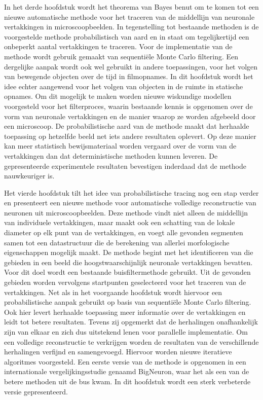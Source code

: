 In het derde hoofdstuk wordt het theorema van Bayes benut om te komen tot een nieuwe automatische methode voor het traceren van de middellijn van neuronale vertakkingen in microscoopbeelden. In tegenstelling tot bestaande methoden is de voorgestelde methode probabilistisch van aard en in staat om tegelijkertijd een onbeperkt aantal vertakkingen te traceren. Voor de implementatie van de methode wordt gebruik gemaakt van sequentiële Monte Carlo filtering. Een dergelijke aanpak wordt ook wel gebruikt in andere toepassingen, voor het volgen van bewegende objecten over de tijd in filmopnames. In dit hoofdstuk wordt het idee echter aangewend voor het volgen van objecten in de ruimte in statische opnames. Om dit mogelijk te maken worden nieuwe wiskundige modellen voorgesteld voor het filterproces, waarin bestaande kennis is opgenomen over de vorm van neuronale vertakkingen en de manier waarop ze worden afgebeeld door een microscoop. De probabilistische aard van de methode maakt dat herhaalde toepassing op hetzelfde beeld net iets andere resultaten oplevert. Op deze manier kan meer statistisch bewijsmateriaal worden vergaard over de vorm van de vertakkingen dan dat deterministische methoden kunnen leveren. De gepresenteerde experimentele resultaten bevestigen inderdaad dat de methode nauwkeuriger is.

Het vierde hoofdstuk tilt het idee van probabilistische tracing nog een stap verder en presenteert een nieuwe methode voor automatische volledige reconstructie van neuronen uit microscoopbeelden. Deze methode vindt niet alleen de middellijn van individuele vertakkingen, maar maakt ook een schatting van de lokale diameter op elk punt van de vertakkingen, en voegt alle gevonden segmenten samen tot een datastructuur die de berekening van allerlei morfologische eigenschappen mogelijk maakt. De methode begint met het identificeren van die gebieden in een beeld die hoogstwaarschijnlijk neuronale vertakkingen bevatten. Voor dit doel wordt een bestaande buisfiltermethode gebruikt. Uit de gevonden gebieden worden vervolgens startpunten geselecteerd voor het traceren van de vertakkingen. Net als in het voorgaande hoofdstuk wordt hiervoor een probabilistische aanpak gebruikt op basis van sequentiële Monte Carlo filtering. Ook hier levert herhaalde toepassing meer informatie over de vertakkingen en leidt tot betere resultaten. Tevens zij opgemerkt dat de herhalingen onafhankelijk zijn van elkaar en zich dus uitstekend lenen voor parallelle implementatie. Om een volledige reconstructie te verkrijgen worden de resultaten van de verschillende herhalingen verfijnd en samengevoegd. Hiervoor worden nieuwe iteratieve algoritmes voorgesteld. Een eerste versie van de methode is opgenomen in een internationale vergelijkingsstudie genaamd BigNeuron, waar het als een van de betere methoden uit de bus kwam. In dit hoofdstuk wordt een sterk verbeterde versie gepresenteerd.

